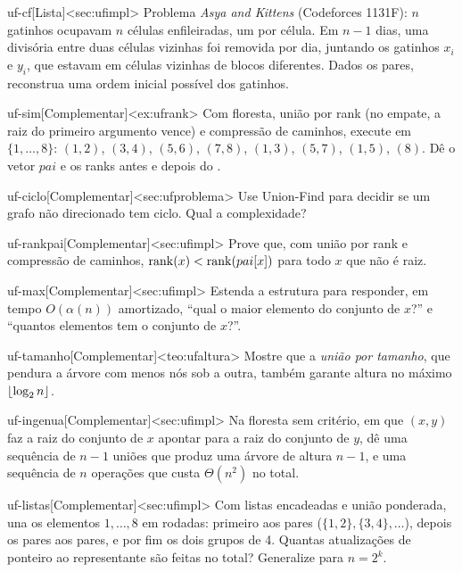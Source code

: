 \begin{exercicio}{uf-cf}[Lista]<sec:ufimpl>
Problema \emph{Asya and Kittens} (Codeforces 1131F): $n$ gatinhos ocupavam $n$ células enfileiradas, um por célula. Em $n-1$ dias, uma divisória entre duas células vizinhas foi removida por dia, juntando os gatinhos $x_i$ e $y_i$, que estavam em células vizinhas de blocos diferentes. Dados os pares, reconstrua uma ordem inicial possível dos gatinhos.
\end{exercicio}

\excompl
\begin{exercicio}{uf-sim}[Complementar]<ex:ufrank>
Com floresta, união por rank (no empate, a raiz do primeiro argumento vence) e compressão de caminhos, execute em $\{1,\dots,8\}$: \Union$(1,2)$, \Union$(3,4)$, \Union$(5,6)$, \Union$(7,8)$, \Union$(1,3)$, \Union$(5,7)$, \Union$(1,5)$, \Find$(8)$. Dê o vetor $pai$ e os ranks antes e depois do \Find.
\end{exercicio}
\begin{exercicio}{uf-ciclo}[Complementar]<sec:ufproblema>
Use Union-Find para decidir se um grafo não direcionado tem ciclo. Qual a complexidade?
\end{exercicio}
\begin{exercicio}{uf-rankpai}[Complementar]<sec:ufimpl>
Prove que, com união por rank e compressão de caminhos, $\operatorname{rank}(x)<\operatorname{rank}(pai[x])$ para todo $x$ que não é raiz.
\end{exercicio}
\begin{exercicio}{uf-max}[Complementar]<sec:ufimpl>
Estenda a estrutura para responder, em tempo $O(\alpha(n))$ amortizado, ``qual o maior elemento do conjunto de $x$?'' e ``quantos elementos tem o conjunto de $x$?''.
\end{exercicio}
\begin{exercicio}{uf-tamanho}[Complementar]<teo:ufaltura>
Mostre que a \emph{união por tamanho}, que pendura a árvore com menos nós sob a outra, também garante altura no máximo $\lfloor\log_2n\rfloor$.
\end{exercicio}
\begin{exercicio}{uf-ingenua}[Complementar]<sec:ufimpl>
Na floresta sem critério, em que \Union$(x,y)$ faz a raiz do conjunto de $x$ apontar para a raiz do conjunto de $y$, dê uma sequência de $n-1$ uniões que produz uma árvore de altura $n-1$, e uma sequência de $n$ operações \Find{} que custa $\Theta(n^2)$ no total.
\end{exercicio}
\begin{exercicio}{uf-listas}[Complementar]<sec:ufimpl>
Com listas encadeadas e união ponderada, una os elementos $1,\dots,8$ em rodadas: primeiro aos pares ($\{1,2\},\{3,4\},\dots$), depois os pares aos pares, e por fim os dois grupos de 4. Quantas atualizações de ponteiro ao representante são feitas no total? Generalize para $n=2^k$.
\end{exercicio}
